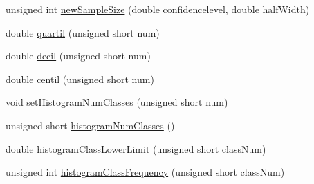 \begin{DoxyCompactItemize}
\item 
unsigned int \hyperlink{class_statistics_my_impl1_a61278828268208d484ae1ceb82bc8ad8}{new\-Sample\-Size} (double confidencelevel, double half\-Width)
\item 
double \hyperlink{class_statistics_my_impl1_abf81ba44177a032fce8bbe7f775b77b6}{quartil} (unsigned short num)
\item 
double \hyperlink{class_statistics_my_impl1_ae9b726c6f571f906cf413a618da7e87b}{decil} (unsigned short num)
\item 
double \hyperlink{class_statistics_my_impl1_acdadfa7b651ae6dcbe5c43d77b0cb084}{centil} (unsigned short num)
\item 
void \hyperlink{class_statistics_my_impl1_a589bb9a58d92720b4b9ab18456fcf95a}{set\-Histogram\-Num\-Classes} (unsigned short num)
\item 
unsigned short \hyperlink{class_statistics_my_impl1_a43e7f87f01b84e9f137eb8c60a036a6f}{histogram\-Num\-Classes} ()
\item 
double \hyperlink{class_statistics_my_impl1_aa78fe0eff5d2aa36dda26837d18796f4}{histogram\-Class\-Lower\-Limit} (unsigned short class\-Num)
\item 
unsigned int \hyperlink{class_statistics_my_impl1_a01889ba1456bea0be29caac98de4d666}{histogram\-Class\-Frequency} (unsigned short class\-Num)
\end{DoxyCompactItemize}



